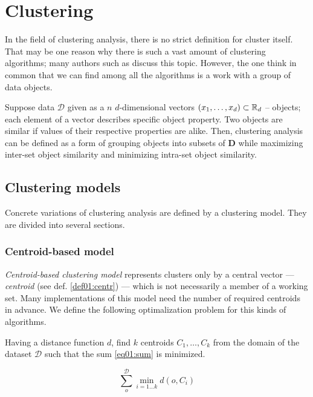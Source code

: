 \chapter{Clustering}

In the field of clustering analysis, there is no strict definition for cluster itself. That may be one reason why there is such a vast amount of clustering algorithms; many authors such as \citet{estivill2002so} discuss this topic.  However, the one think in common that we can find among all the algorithms is a work with a group of data objects.

Suppose data $\mathcal{D}$ given as a $n$ $d$-dimensional vectors $(x_1,\dots,x_d) \subset \mathbb{R}_d$  -- objects; each element of a vector describes specific object property. Two objects are similar if values of their respective properties are alike. Then, clustering analysis can be defined as a form of grouping objects into subsets of $\mathbf{D}$ while maximizing inter-set object similarity and minimizing intra-set object similarity.

\section{Clustering models}

Concrete variations of clustering analysis are defined by a clustering model. They are divided into several sections.

\subsection{Centroid-based model}

\emph{Centroid-based clustering model} represents clusters only by a central vector --- \emph{centroid} (see def. \ref{def01:centr}) --- which is not necessarily a member of a working set. Many implementations of this model need the number of required centroids in advance. We define the following optimalization problem for this kinds of algorithms. 

\begin{problem}
	Having a distance function $d$, find $k$ centroids $C_1,\dots,C_k$ from the domain of the dataset $\mathcal{D}$ such that the sum \ref{eq01:sum}
	is minimized.
\end{problem}

\begin{equation}\label{eq01:sum}
	\sum_o^{\mathcal{D}} \min_{i=1\dots k}d(o,C_i)
\end{equation}

